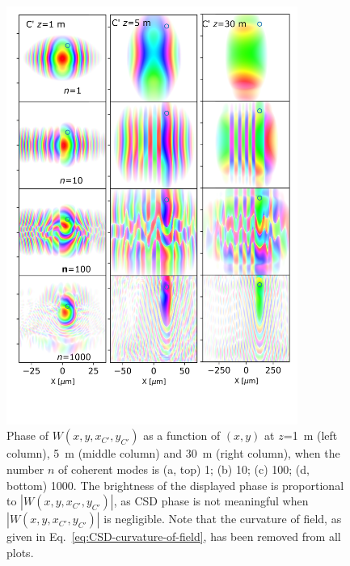 \documentclass[%
 reprint,
 amsmath,amssymb,
 aps,
]{revtex4-1}
\begin{document}
\begin{figure}
\includegraphics[width=0.85\textwidth]{Figures/vx_id16a_C1-5-30_propagated.png}
\caption{Phase of $W(x,y,x_{C'},y_{C'})$ as a function of $(x,y)$ at $z$=1~m (left column), 5~m (middle column) and 30~m (right column), when the number $n$ of coherent modes is (a, top) 1; (b) 10; (c) 100; (d, bottom) 1000. The brightness of the displayed phase is proportional to $|W(x,y,x_{C'},y_{C'})|$, as CSD phase is not meaningful when $|W(x,y,x_{C'},y_{C'})|$ is negligible. Note that the curvature of field, as given in Eq.~\ref{eq:CSD-curvature-of-field}, has been removed from all plots.}
\label{pointC_propagated}%
\end{figure}
\end{document}
